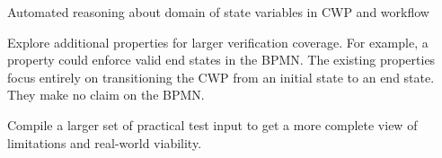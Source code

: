 \begin{comment}
Other research under consideration could explore reuse of verified designs in watcher systems that monitor their deployed implementations. CWP models could also be used to derive efficiency measures, e.g., reducing the amount of activity that does not advance the CWP states could be a new approach to efficiency.  

The focus of conventional design methods is on software, which leaves important aspects of system success largely to chance. 
This paper's novel contribution is verifiable integration of human-computer teaming on cognitive tasks. 
The need is industry-wide. 
Expected benefits of verifiable integration include greater safety and reliability of systems for many other critical domains. 

\end{comment}

Automated reasoning about domain of state variables in CWP and workflow

Explore additional properties for larger verification coverage. For example, a property could enforce valid end states in the BPMN. The existing properties focus entirely on transitioning the CWP from an initial state to an end state. They make no claim on the BPMN.

Compile a larger set of practical test input to get a more complete view of limitations and real-world viability.

